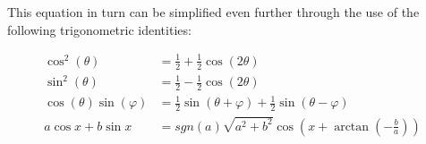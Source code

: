 This equation in turn can be simplified even further through the use of the
following trigonometric identities:

\begin{equation}
    \begin{split}
        \cos^2\left(\theta\right) &= \frac12 + \frac12 \cos\left(2\theta\right) \\
        \sin^2\left(\theta\right) &= \frac12 - \frac12 \cos\left(2\theta\right) \\
        \cos\left(\theta\right)\sin\left(\varphi\right) &= \frac12\sin\left(\theta + \varphi\right) + \frac12 \sin\left(\theta - \varphi\right) \\
        a\cos x + b \sin x &= sgn(a) \sqrt{a^2 + b^2} \cos\left(x + \arctan\left(-\frac ba\right)\right)
    \end{split}
\end{equation}

